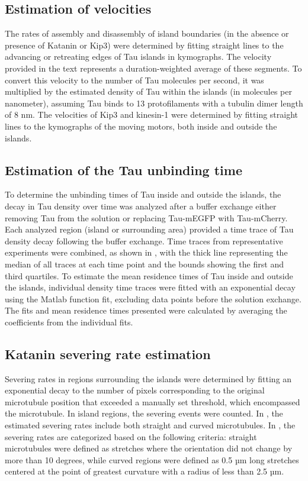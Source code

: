 \subsection{Estimation of velocities}
The rates of assembly and disassembly of island boundaries (in the absence or presence of Katanin or Kip3) were determined by fitting straight lines to the advancing or retreating edges of Tau islands in kymographs. The velocity provided in the text represents a duration-weighted average of these segments. To convert this velocity to the number of Tau molecules per second, it was multiplied by the estimated density of Tau within the islands (in molecules per nanometer), assuming Tau binds to 13 protofilaments with a tubulin dimer length of 8 nm. The velocities of Kip3 and kinesin-1 were determined by fitting straight lines to the kymographs of the moving motors, both inside and outside the islands.

\subsection{Estimation of the Tau unbinding time}
To determine the unbinding times of Tau inside and outside the islands, the decay in Tau density over time was analyzed after a buffer exchange either removing Tau from the solution or replacing Tau-mEGFP with Tau-mCherry. Each analyzed region (island or surrounding area) provided a time trace of Tau density decay following the buffer exchange. Time traces from representative experiments were combined, as shown in , with the thick line representing the median of all traces at each time point and the bounds showing the first and third quartiles. To estimate the mean residence times of Tau inside and outside the islands, individual density time traces were fitted with an exponential decay using the Matlab function fit, excluding data points before the solution exchange. The fits and mean residence times presented were calculated by averaging the coefficients from the individual fits.

\subsection{Katanin severing rate estimation}
Severing rates in regions surrounding the islands were determined by fitting an exponential decay to the number of pixels corresponding to the original microtubule position that exceeded a manually set threshold, which encompassed the microtubule. In island regions, the severing events were counted. In , the estimated severing rates include both straight and curved microtubules. In , the severing rates are categorized based on the following criteria: straight microtubules were defined as stretches where the orientation did not change by more than 10 degrees, while curved regions were defined as 0.5 µm long stretches centered at the point of greatest curvature with a radius of less than 2.5 µm.

